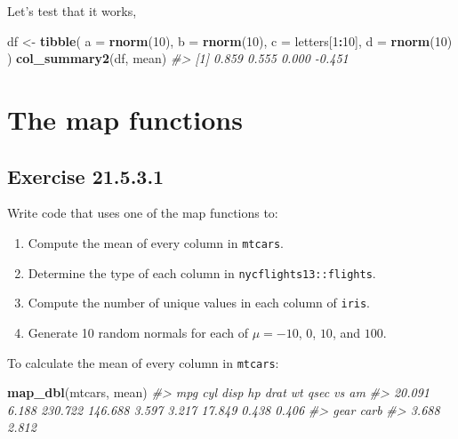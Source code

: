 \documentclass[]{book}
\newenvironment{Shaded}{\begin{snugshade}}{\end{snugshade}}
\newcommand{\CommentTok}[1]{\textcolor[rgb]{0.56,0.35,0.01}{\textit{#1}}}
\newcommand{\DataTypeTok}[1]{\textcolor[rgb]{0.13,0.29,0.53}{#1}}
\newcommand{\DecValTok}[1]{\textcolor[rgb]{0.00,0.00,0.81}{#1}}
\newcommand{\KeywordTok}[1]{\textcolor[rgb]{0.13,0.29,0.53}{\textbf{#1}}}
\newcommand{\NormalTok}[1]{#1}
\newcommand{\OperatorTok}[1]{\textcolor[rgb]{0.81,0.36,0.00}{\textbf{#1}}}
\newcommand{\StringTok}[1]{\textcolor[rgb]{0.31,0.60,0.02}{#1}}
\providecommand{\tightlist}{%
  \setlength{\itemsep}{0pt}\setlength{\parskip}{0pt}}
\theoremstyle{plain}
\theoremstyle{remark}
\begin{document}
Let's test that it works,

\begin{Shaded}
\begin{Highlighting}[]
\NormalTok{df <-}\StringTok{ }\KeywordTok{tibble}\NormalTok{(}
  \DataTypeTok{a =} \KeywordTok{rnorm}\NormalTok{(}\DecValTok{10}\NormalTok{),}
  \DataTypeTok{b =} \KeywordTok{rnorm}\NormalTok{(}\DecValTok{10}\NormalTok{),}
  \DataTypeTok{c =}\NormalTok{ letters[}\DecValTok{1}\OperatorTok{:}\DecValTok{10}\NormalTok{],}
  \DataTypeTok{d =} \KeywordTok{rnorm}\NormalTok{(}\DecValTok{10}\NormalTok{)}
\NormalTok{)}
\KeywordTok{col_summary2}\NormalTok{(df, mean)}
\CommentTok{#> [1]  0.859  0.555  0.000 -0.451}
\end{Highlighting}
\end{Shaded}

\hypertarget{the-map-functions}{%
\section{The map functions}\label{the-map-functions}}

\hypertarget{exercise-21.5.3.1}{%
\subsection*{\texorpdfstring{Exercise
{21.5.3.1}}{Exercise 21.5.3.1}}\label{exercise-21.5.3.1}}

Write code that uses one of the map functions to:

\begin{enumerate}
\def\labelenumi{\arabic{enumi}.}
\tightlist
\item
  Compute the mean of every column in \texttt{mtcars}.
\item
  Determine the type of each column in \texttt{nycflights13::flights}.
\item
  Compute the number of unique values in each column of \texttt{iris}.
\item
  Generate 10 random normals for each of \(\mu = -10\), \(0\), \(10\),
  and \(100\).
\end{enumerate}

To calculate the mean of every column in \texttt{mtcars}:

\begin{Shaded}
\begin{Highlighting}[]
\KeywordTok{map_dbl}\NormalTok{(mtcars, mean)}
\CommentTok{#>     mpg     cyl    disp      hp    drat      wt    qsec      vs      am }
\CommentTok{#>  20.091   6.188 230.722 146.688   3.597   3.217  17.849   0.438   0.406 }
\CommentTok{#>    gear    carb }
\CommentTok{#>   3.688   2.812}
\end{Highlighting}
\end{Shaded}
\end{document}
